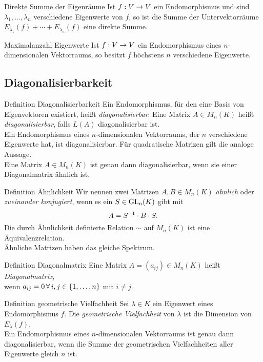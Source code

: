 \documentclass[main.tex]{subfiles}
\begin{document}
\begin{karte}{Direkte Summe der Eigenräume}
    Ist \( f : V \rightarrow V \) ein Endomorphismus und sind 
    \( \lambda_1,\ldots,\lambda_n \) verschiedene Eigenwerte 
    von \(f\), so ist die Summe der Untervektorräume 
    \( E_{\lambda_1}(f) + \cdots + E_{\lambda_n}(f) \) eine 
    direkte Summe.
\end{karte}
\begin{karte}{Maximalanzahl Eigenwerte}
    Ist \( f : V \rightarrow V \) ein Endomorphismus eines 
    \(n\)-dimensionalen Vektorraums, so besitzt \(f\) 
    höchstens \(n\) verschiedene Eigenwerte.
\end{karte}
\subsection*{Diagonalisierbarkeit}
\begin{karte}{Definition Diagonalisierbarkeit}
    Ein Endomorphismus, für den eine Basis von Eigenvektoren 
    existiert, heißt \textit{diagonalisierbar}. Eine Matrix 
    \( A \in M_n(K) \) heißt \textit{diagonalisierbar}, falls 
    \( L(A) \) diagonalisierbar ist.\\
    Ein Endomorphismus eines \(n\)-dimensionalen Vektorraums, 
    der \(n\) verschiedene Eigenwerte hat, ist diagonalisierbar. 
    Für quadratische Matrizen gilt die analoge Aussage.\\
    Eine Matrix \( A \in M_n(K) \) ist genau dann diagonalisierbar, 
    wenn sie einer Diagonalmatrix ähnlich ist.
\end{karte}
\begin{karte}{Definition Ähnlichkeit}
    Wir nennen zwei Matrizen \( A, B \in M_n(K) \) 
    \textit{ähnlich} oder \textit{zueinander konjugiert}, 
    wenn es ein \( S \in \operatorname{GL}_n(K) \) gibt mit 
    \[ A = \inverse{S} \cdot B \cdot S. \]
    Die durch Ähnlichkeit definierte Relation \( \sim \) 
    auf \( M_n(K) \) ist eine Äquivalenzrelation.\\
    Ähnliche Matrizen haben das gleiche Spektrum.
\end{karte}
\begin{karte}{Definition Diagonalmatrix}
    Eine Matrix \( A = (a_{ij}) \in M_n(K) \) heißt 
    \textit{Diagonalmatrix}, \\
    wenn \( a_{ij} = 0 
    \, \forall i,j \in \set{1,\ldots,n} \) mit \( i \neq j \).\\
\end{karte}
\begin{karte}{Definition geometrische Vielfachheit}
    Sei \( \lambda \in K \) ein Eigenwert eines Endomorphismus 
    \( f \). Die \textit{geometrische Vielfachheit} von 
    \( \lambda \) ist die Dimension von \( E_\lambda(f) \).\\
    Ein Endomorphismus eines \(n\)-dimensionalen Vektorraums 
    ist genau dann diagonalisierbar, wenn die Summe der 
    geometrischen Vielfachheiten aller Eigenwerte gleich 
    \(n\) ist.
\end{karte}
\end{document}
